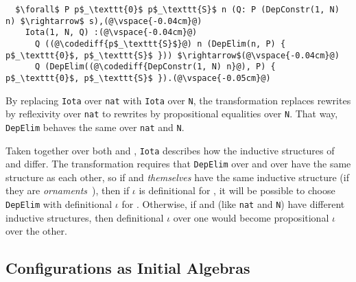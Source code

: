 \begin{lstlisting}
  $\forall$ P p$_\texttt{0}$ p$_\texttt{S}$ n (Q: P (DepConstr(1, N) n) $\rightarrow$ s),(@\vspace{-0.04cm}@)
    Iota(1, N, Q) :(@\vspace{-0.04cm}@)
      Q ((@\codediff{p$_\texttt{S}$}@) n (DepElim(n, P) { p$_\texttt{0}$, p$_\texttt{S}$ })) $\rightarrow$(@\vspace{-0.04cm}@)
      Q (DepElim((@\codediff{DepConstr(1, N) n}@), P) { p$_\texttt{0}$, p$_\texttt{S}$ }).(@\vspace{-0.05cm}@)
\end{lstlisting}
By replacing \lstinline{Iota} over \lstinline{nat} with \lstinline{Iota} over \lstinline{N},
the transformation replaces rewrites by reflexivity over \lstinline{nat} to rewrites by propositional equalities over \lstinline{N}.
That way, \lstinline{DepElim} behaves the same over \lstinline{nat} and \lstinline{N}.

Taken together over both \Aa and \B, \lstinline{Iota} describes how the inductive structures of \Aa and \B differ.
The transformation requires that \lstinline{DepElim} over \Aa and over \B have the same structure
as each other, so if \Aa and \B \textit{themselves} have the same 
inductive structure (if they are \textit{ornaments}~\cite{mcbride}),
then if $\iota$ is definitional for \Aa, it will be possible to choose
\lstinline{DepElim} with definitional $\iota$ for \B.
Otherwise, if \Aa and \B (like \lstinline{nat} and \lstinline{N}) have different inductive structures,
then definitional $\iota$ over one would become propositional $\iota$ over the other.

\subsection{Configurations as Initial Algebras}
\label{sec:art}

